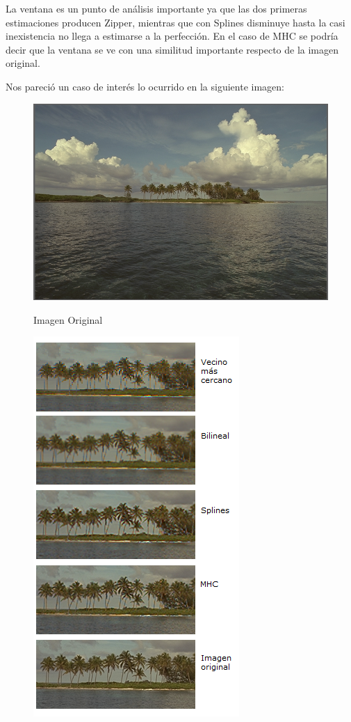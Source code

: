 \documentclass[a4paper]{article}
\begin{document}
La ventana es un punto de an\'alisis importante ya que las dos primeras estimaciones producen Zipper, mientras que con Splines disminuye hasta la casi inexistencia no llega a estimarse a la perfecci\'on. En el caso de MHC se podr\'ia decir que la ventana se ve con una similitud importante respecto de la imagen original.

\newpage

Nos pareci\'o un caso de inter\'es lo ocurrido en la siguiente imagen:
\begin{figure}[h!]
    \caption{Imagen Original}
    \begin{center}
    \includegraphics[scale=0.15]{imagenes/comparacion/07/img7}
    \label{imgOri2}
  \end{center}
\end{figure}

\begin{figure}[h!]
    \caption{}
    \begin{center}
    \includegraphics[scale=1]{imagenes/comparacion/07/palmeritas}
    \label{palmas}
  \end{center}
\end{figure}
\end{document}

